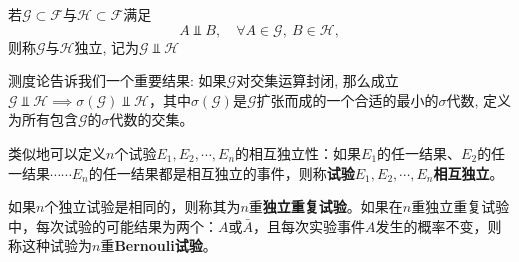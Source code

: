 \begin{definition}[事件域的独立性]
    若$\mathscr{G} \subset \mathscr{F}$与$\mathscr{H} \subset \mathscr{F}$满足
    \[ A \Vbar B, \quad \forall A\in\mathscr{G},\ B\in\mathscr{H}, \]
    则称$\mathscr{G}$与$\mathscr{H}$独立, 记为$\mathscr{G} \Vbar \mathscr{H}$
\end{definition}

测度论告诉我们一个重要结果: 如果$\mathscr{G}$对交集运算封闭, 那么成立$\mathscr{G}\Vbar\mathscr{H} \implies \sigma(\mathscr{G}) \Vbar \mathscr{H}$，其中$\sigma(\mathscr{G})$是$\mathscr{G}$扩张而成的一个合适的最小的$\sigma$代数, 定义为所有包含$\mathscr{G}$的$\sigma$代数的交集。

类似地可以定义$n$个试验$E_1,E_2,\cdots,E_n$的相互独立性：如果$E_1$的任一结果、$E_2$的任一结果$\cdots\cdots E_n$的任一结果都是相互独立的事件，则称\textbf{试验$E_1,E_2,\cdots,E_n$相互独立}。

\begin{definition}[Bernouli试验]\label{def:Bernouli_experiment}
    如果$n$个独立试验是相同的，则称其为$n$重\textbf{独立重复试验}。如果在$n$重独立重复试验中，每次试验的可能结果为两个：$A$或$\bar A$，且每次实验事件$A$发生的概率不变，则称这种试验为$n$重\textbf{Bernouli试验}。
\end{definition}

